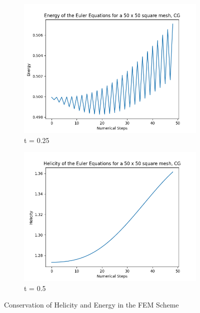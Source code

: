 \begin{figure}[!ht]
  \centering
  \begin{subfigure}[b]{0.475\textwidth}
      \centering
      \includegraphics[width=\textwidth]{./img/energy}
      \caption[Network2]%
      {{\small t = 0.25}}
      \label{fig:energy}
  \end{subfigure}
  \hfill
  \begin{subfigure}[b]{0.475\textwidth}
      \centering
      \includegraphics[width=\textwidth]{./img/helicity}
      \caption[]%
      {{\small t = 0.5}}
      \label{fig:helcity}
  \end{subfigure}
  \caption{Conservation of Helicity and Energy in the FEM Scheme}
  \label{fig:conservation}
\end{figure}

